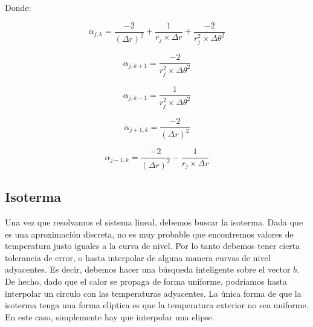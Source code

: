 Donde:

\begin{equation}
\alpha_{j,k} = \frac{-2}{(\Delta r)^2} + \frac{1}{r_j \times \Delta r} + \frac{-2}{r_j^2 \times \Delta \theta^2}
\end{equation}

\begin{equation}
\alpha_{j,k+1} = \frac{-2}{r_j^2 \times \Delta \theta^2}
\end{equation}

\begin{equation}
\alpha_{j,k-1} = \frac{1}{r_j^2 \times \Delta \theta^2}
\end{equation}

\begin{equation}
\alpha_{j+1,k} = \frac{-2}{(\Delta r)^2}
\end{equation}

\begin{equation}
\alpha_{j-1,k} = \frac{-2}{(\Delta r)^2} - \frac{1}{r_j \times \Delta r}
\end{equation}

\subsection{Isoterma}
Una vez que resolvamos el sistema lineal, debemos buscar la isoterma. Dada que es una aproximación discreta, no es muy probable que encontremos valores de temperatura justo iguales a la curva de nivel. Por lo tanto debemos tener cierta tolerancia de error, o hasta interpolar de alguna manera curvas de nivel adyacentes. Es decir, debemos hacer una búsqueda inteligente sobre el vector $b$. De hecho, dado que el calor se propaga de forma uniforme, podríamos hasta interpolar un circulo con las temperaturas adyacentes. La única forma de que la isoterma tenga una forma elíptica es que la temperatura exterior no sea uniforme. En este caso, simplemente hay que interpolar una elipse.